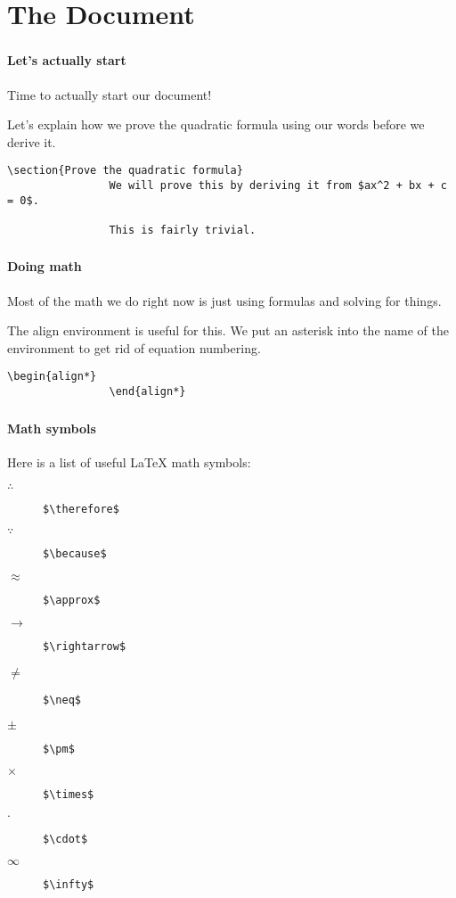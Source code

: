 \documentclass{beamer}
\begin{document}
	\section{The Document}
	\begin{frame}[fragile]
		\frametitle{\secname}
		\framesubtitle{Let's actually start}
		Time to actually start our document!

		Let's explain how we prove the quadratic formula using our words before we derive it.
		\begin{example}
			\begin{lstlisting}[numbers=none, gobble=16]
				\section{Prove the quadratic formula}
				We will prove this by deriving it from $ax^2 + bx + c = 0$.

				This is fairly trivial.
			\end{lstlisting}
		\end{example}
	\end{frame}
	\begin{frame}[fragile]
		\frametitle{\secname}
		\framesubtitle{Doing math}
		Most of the math we do right now is just using formulas and solving for things.

		The \alert{align} environment is useful for this. We put an asterisk into the name of the environment to get rid of equation numbering.
		\begin{example}
			\begin{lstlisting}[numbers=none, gobble=16]
				\begin{align*}
				\end{align*}
			\end{lstlisting}
		\end{example}
	\end{frame}
	\begin{frame}[fragile]
		\frametitle{\secname}
		\framesubtitle{Math symbols}
		Here is a list of useful \LaTeX{} math symbols:
		\begin{description}	
			\item[$\therefore$] \lstinline{$\therefore$}
			\item[$\because$] \lstinline{$\because$}
			\item[$\approx$] \lstinline{$\approx$}
			\item[$\rightarrow$] \lstinline{$\rightarrow$}
			\item[$\neq$] \lstinline{$\neq$}
			\item[$\pm$] \lstinline{$\pm$}
			\item[$\times$] \lstinline{$\times$}
			\item[$\cdot$] \lstinline{$\cdot$}
			\item[$\infty$] \lstinline{$\infty$}
		\end{description}	
	\end{frame}
\end{document}
